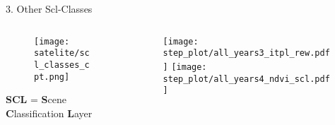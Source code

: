 \begin{frame}[t]{3. Other Scl-Classes}
    \begin{columns}
        \begin{column}{0.45\textwidth}
            \vspace{-1cm}
            \begin{figure}
                \texttt{[image: satelite/scl\_classes\_cpt.png]}
            \end{figure}
            \textbf{SCL} = \textbf{S}cene \textbf{C}lassification \textbf{L}ayer
        \end{column}
        \begin{column}{0.45\textwidth}
            \begin{figure}
                \vspace{-1.6cm}
                \texttt{[image: step\_plot/all\_years3\_itpl\_rew.pdf]}
                \texttt{[image: step\_plot/all\_years4\_ndvi\_scl.pdf]}
            \end{figure}
        \end{column}
    \end{columns}
\end{frame}

